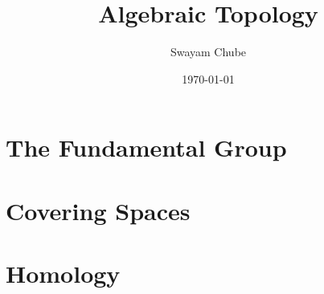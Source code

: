 \documentclass[oneside]{report}
\title{Algebraic Topology}
\author{Swayam Chube}
\date{\today}
\begin{document}
\maketitle
\tableofcontents

\chapter{The Fundamental Group}


\chapter{Covering Spaces}


\chapter{Homology}

\end{document}
